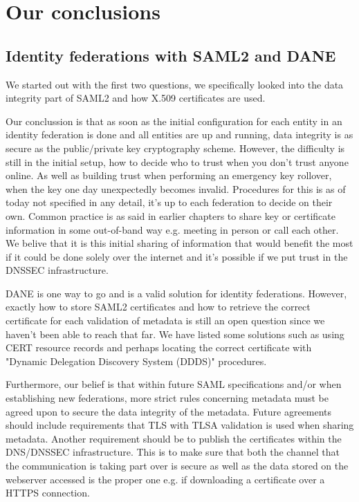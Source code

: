 \section{Our conclusions}
\subsection{Identity federations with SAML2 and DANE}
We started out with the first two questions, we specifically looked into the data integrity part of SAML2 and how X.509 certificates are used. 

Our conclussion is that as soon as the initial configuration for each entity in an identity federation is done and all 
entities are up and running, data integrity is as secure as the public/private key cryptography scheme.
However, the difficulty is still in the initial setup, how to decide who to trust when you don't trust anyone online. 
As well as building trust when performing an emergency key rollover, when the key one day unexpectedly becomes invalid. 
Procedures for this is as of today not specified in any detail, it's up to each federation to decide on their own.
Common practice is as said in earlier chapters to share key or certificate information in some out-of-band way e.g. meeting in person or call each other.
We belive that it is this initial sharing of information that would benefit the most if it could be done solely over the internet and it's possible if we put trust in the DNSSEC infrastructure.

DANE is one way to go and is a valid solution for identity federations.
However, exactly how to store SAML2 certificates and how to retrieve the correct certificate for each validation of metadata is still an open question since we haven't been able to reach that far.
We have listed some solutions such as using CERT resource records and perhaps locating the correct certificate with "Dynamic Delegation Discovery System (DDDS)" procedures.

Furthermore, our belief is that within future SAML specifications and/or when establishing new federations, more strict rules concerning metadata must be agreed upon to secure the data integrity of the metadata.
Future agreements should include requirements that TLS with TLSA validation is used when sharing metadata.
Another requirement should be to publish the certificates within the DNS/DNSSEC infrastructure.
This is to make sure that both the channel that the communication is taking part over is secure as well as the data stored on the webserver accessed is the proper one e.g. if downloading a certificate over a HTTPS connection.


